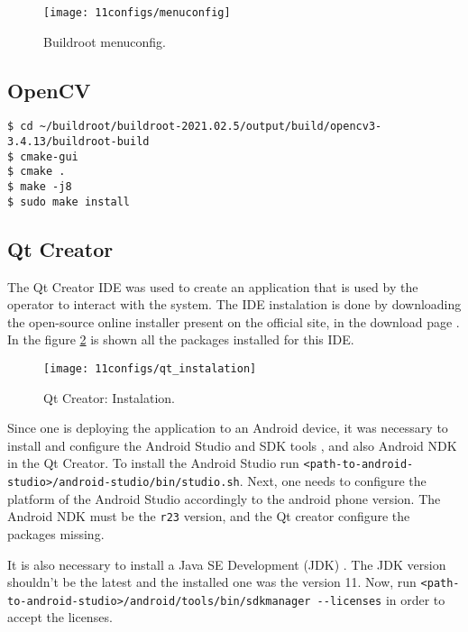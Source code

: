 \begin{figure}[H]
	\centering	
	\texttt{[image: 11configs/menuconfig]}
	\caption{Buildroot menuconfig.}
	\label{fig:menuconfig}
\end{figure}

\subsection{OpenCV}

\begin{lstlisting}
$ cd ~/buildroot/buildroot-2021.02.5/output/build/opencv3-3.4.13/buildroot-build
$ cmake-gui
$ cmake .
$ make -j8
$ sudo make install
\end{lstlisting}

\subsection{Qt Creator}

The Qt Creator IDE was used to create an application that is used by the operator to interact with the system. The IDE instalation is done by downloading the open-source online installer present on the official site, in the download page \cite{qt_creator}. In the figure \ref{fig:qt_instalation} is shown all the packages installed for this IDE.

\begin{figure}[H]
	\centering	
	\texttt{[image: 11configs/qt\_instalation]}
	\caption{Qt Creator: Instalation.}
	\label{fig:qt_instalation}
\end{figure}

Since one is deploying the application to an Android device, it was necessary to install and configure the Android Studio and SDK tools \cite{android_studio}, and also Android NDK \cite{android_ndk} in the Qt Creator. To install the Android Studio run \verb|<path-to-android-studio>/android-studio/bin/studio.sh|. Next, one needs to configure the platform of the Android Studio accordingly to the android phone version. The Android NDK must be the \verb|r23| version, and the Qt creator configure the packages missing.

It is also necessary to install a Java SE Development (JDK) \cite{java}. The JDK version shouldn't be the latest and the installed one was the version 11. Now, run \verb|<path-to-android-studio>/android/tools/bin/sdkmanager --licenses| in order to accept the licenses. 


